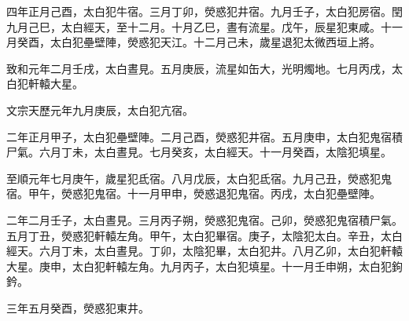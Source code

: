 \begin{pinyinscope}
 四年正月己酉，太白犯牛宿。三月丁卯，熒惑犯井宿。九月壬子，太白犯房宿。閏九月己巳，太白經天，至十二月。十月乙巳，晝有流星。戊午，辰星犯東咸。十一月癸酉，太白犯壘壁陣，熒惑犯天江。十二月己未，歲星退犯太微西垣上將。



 致和元年二月壬戌，太白晝見。五月庚辰，流星如缶大，光明燭地。七月丙戌，太白犯軒轅大星。



 文宗天歷元年九月庚辰，太白犯亢宿。



 二年正月甲子，太白犯壘壁陣。二月己酉，熒惑犯井宿。五月庚申，太白犯鬼宿積尸氣。六月丁未，太白晝見。七月癸亥，太白經天。十一月癸酉，太陰犯填星。



 至順元年七月庚午，歲星犯氐宿。八月戊辰，太白犯氐宿。九月己丑，熒惑犯鬼宿。甲午，熒惑犯鬼宿。十一月甲申，熒惑退犯鬼宿。丙戌，太白犯壘壁陣。



 二年二月壬子，太白晝見。三月丙子朔，熒惑犯鬼宿。己卯，熒惑犯鬼宿積尸氣。五月丁丑，熒惑犯軒轅左角。甲午，太白犯畢宿。庚子，太陰犯太白。辛丑，太白經天。六月丁未，太白晝見。丁卯，太陰犯畢，太白犯井。八月乙卯，太白犯軒轅大星。庚申，太白犯軒轅左角。九月丙子，太白犯填星。十一月壬申朔，太白犯鉤鈐。



 三年五月癸酉，熒惑犯東井。



\end{pinyinscope}